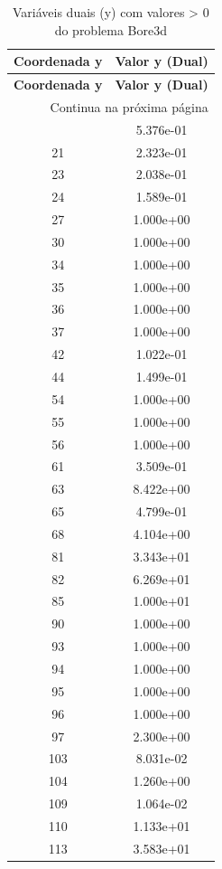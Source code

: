 \documentclass[12pt]{article}
\begin{document}
\begin{longtable}{@{}cc@{}}
\caption{Variáveis duais (y) com valores > 0 do problema Bore3d} \\
\toprule
\textbf{Coordenada y} & \textbf{Valor y (Dual)} \\
\midrule
\endfirsthead

\toprule
\textbf{Coordenada y} & \textbf{Valor y (Dual)} \\
\midrule
\endhead

\midrule \multicolumn{2}{r}{{Continua na próxima página}} \\ \midrule
\endfoot

\bottomrule
\endlastfoot
2 & 5.376e-01 \\
21 & 2.323e-01 \\
23 & 2.038e-01 \\
24 & 1.589e-01 \\
27 & 1.000e+00 \\
30 & 1.000e+00 \\
34 & 1.000e+00 \\
35 & 1.000e+00 \\
36 & 1.000e+00 \\
37 & 1.000e+00 \\
42 & 1.022e-01 \\
44 & 1.499e-01 \\
54 & 1.000e+00 \\
55 & 1.000e+00 \\
56 & 1.000e+00 \\
61 & 3.509e-01 \\
63 & 8.422e+00 \\
65 & 4.799e-01 \\
68 & 4.104e+00 \\
81 & 3.343e+01 \\
82 & 6.269e+01 \\
85 & 1.000e+01 \\
90 & 1.000e+00 \\
93 & 1.000e+00 \\
94 & 1.000e+00 \\
95 & 1.000e+00 \\
96 & 1.000e+00 \\
97 & 2.300e+00 \\
103 & 8.031e-02 \\
104 & 1.260e+00 \\
109 & 1.064e-02 \\
110 & 1.133e+01 \\
113 & 3.583e+01 \\

\end{longtable}
\end{document}
